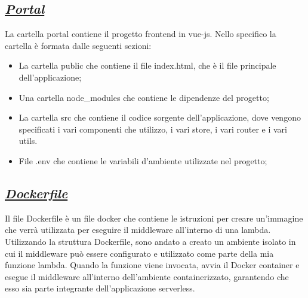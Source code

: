 \subsection*{\normalsize\textit{\uline{Portal}}}
La cartella portal contiene il progetto frontend in vue-js. Nello specifico la cartella è formata dalle seguenti sezioni:
\begin{itemize}
  \item La cartella public che contiene il file index.html, che è il file principale dell'applicazione;
  \item Una cartella node\_modules che contiene le dipendenze del progetto;
  \item La cartella src che contiene il codice sorgente dell'applicazione, dove vengono specificati i vari componenti che utilizzo, i vari store, i vari router e i vari utils.
  \item File .env che contiene le variabili d'ambiente utilizzate nel progetto;
\end{itemize}

\subsection*{\normalsize\textit{\uline{Dockerfile}}}
Il file Dockerfile è un file docker che contiene le istruzioni per creare un'immagine che verrà utilizzata per eseguire il middleware all'interno di una lambda.\\
Utilizzando la struttura Dockerfile, sono andato a creato un ambiente isolato in cui il middleware può essere configurato e utilizzato come parte della mia funzione 
lambda. Quando la funzione viene invocata, avvia il Docker container e esegue il middleware all'interno dell'ambiente containerizzato, 
garantendo che esso sia parte integrante dell'applicazione serverless.











